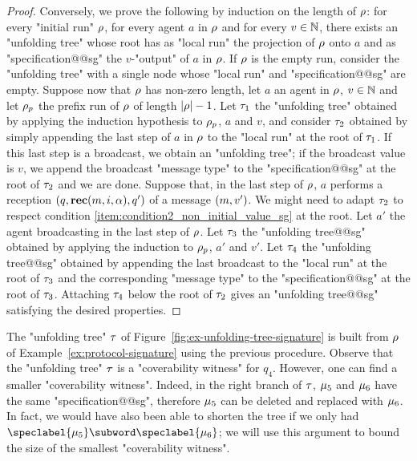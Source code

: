\begin{proof}
Conversely, we prove the following by induction on the length of $\rho$: for every "initial run" $\rho$, for every agent $a$ in $\rho$ and for every $v \in \mathbb{N}$, there exists an "unfolding tree" whose root has as "local run" the projection of $\rho$ onto $a$ and as "specification@@sg" the $v$-"output" of $a$ in $\rho$. If $\rho$ is the empty run, consider the "unfolding tree" with a single node whose "local run" and "specification@@sg" are empty. Suppose now that $\rho$ has non-zero length, let $a$ an agent in $\rho$, $v \in \mathbb{N}$ and let $\rho_p$ the prefix run of $\rho$ of length $|\rho|-1$.
Let $\tau_1$ the "unfolding tree" obtained by applying the induction hypothesis to $\rho_p$, $a$ and $v$, and consider $\tau_2$ obtained by simply appending the last step of $a$ in $\rho$ to the "local run" at the root of $\tau_1$. If this last step is a broadcast, we obtain an "unfolding tree"; if the broadcast value is $v$, we append the broadcast "message type" to the "specification@@sg" at the root of $\tau_2$ and we are done. 
Suppose that, in the last step of $\rho$, $a$ performs a reception $(q, \textbf{rec}(m, i, \alpha),q')$ of a message $(m,v')$. We might need to adapt $\tau_2$ to respect condition \ref{item:condition2_non_initial_value_sg} at the root. Let $a'$ the agent broadcasting in the last step of $\rho$. Let $\tau_3$ the "unfolding tree@@sg" obtained by applying the induction to $\rho_p$, $a'$ and $v'$. Let $\tau_4$ the "unfolding tree@@sg" obtained by appending the last broadcast to the "local run" at the root of $\tau_3$ and the corresponding "message type" to the "specification@@sg" at the root of $\tau_3$. Attaching $\tau_4$ below the root of $\tau_2$ gives an "unfolding tree@@sg" satisfying the desired properties. 
\end{proof}


	The "unfolding tree" $\tau$ of Figure~\ref{fig:ex-unfolding-tree-signature} is built from $\rho$ of Example~\ref{ex:protocol-signature} using the previous procedure.
	 Observe that the "unfolding tree" $\tau$  is a "coverability witness" for $q_4$. However, one can find a smaller "coverability witness". 
	Indeed, in the right branch of $\tau$, $\mu_5$ and $\mu_6$ have the same "specification@@sg", therefore $\mu_5$ can be deleted and replaced with $\mu_6$. In fact, we would have also been able to shorten the tree if we only had $\speclabel{\node_5} \subword \speclabel{\node_6}$; we will use this argument to bound the size of the smallest "coverability witness".   


